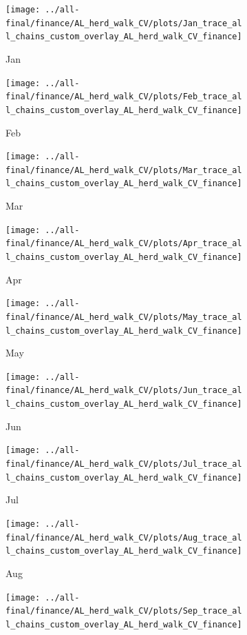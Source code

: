 \documentclass[ngerman]{ttlab-qualify}
\begin{document}
\newpage
\begin{figure}[H]
\centering
  \begin{subfigure}{.3\linewidth}
  \texttt{[image: ../all-final/finance/AL\_herd\_walk\_CV/plots/Jan\_trace\_all\_chains\_custom\_overlay\_AL\_herd\_walk\_CV\_finance]}\hfill
  \caption{Jan}
  \end{subfigure}
  \begin{subfigure}{.3\linewidth}
  \texttt{[image: ../all-final/finance/AL\_herd\_walk\_CV/plots/Feb\_trace\_all\_chains\_custom\_overlay\_AL\_herd\_walk\_CV\_finance]}\hfill
  \caption{Feb}
  \end{subfigure}
  \begin{subfigure}{.3\linewidth}
  \texttt{[image: ../all-final/finance/AL\_herd\_walk\_CV/plots/Mar\_trace\_all\_chains\_custom\_overlay\_AL\_herd\_walk\_CV\_finance]}\hfill
  \caption{Mar}
  \end{subfigure}\par\medskip
  \begin{subfigure}{.3\linewidth}
  \texttt{[image: ../all-final/finance/AL\_herd\_walk\_CV/plots/Apr\_trace\_all\_chains\_custom\_overlay\_AL\_herd\_walk\_CV\_finance]}\hfill
  \caption{Apr}
  \end{subfigure}
  \begin{subfigure}{.3\linewidth}
  \texttt{[image: ../all-final/finance/AL\_herd\_walk\_CV/plots/May\_trace\_all\_chains\_custom\_overlay\_AL\_herd\_walk\_CV\_finance]}\hfill
  \caption{May}
  \end{subfigure}
  \begin{subfigure}{.3\linewidth}
  \texttt{[image: ../all-final/finance/AL\_herd\_walk\_CV/plots/Jun\_trace\_all\_chains\_custom\_overlay\_AL\_herd\_walk\_CV\_finance]}\hfill
  \caption{Jun}
  \end{subfigure}\par\medskip
  \begin{subfigure}{.3\linewidth}
  \texttt{[image: ../all-final/finance/AL\_herd\_walk\_CV/plots/Jul\_trace\_all\_chains\_custom\_overlay\_AL\_herd\_walk\_CV\_finance]}\hfill
  \caption{Jul}
  \end{subfigure}
  \begin{subfigure}{.3\linewidth}
  \texttt{[image: ../all-final/finance/AL\_herd\_walk\_CV/plots/Aug\_trace\_all\_chains\_custom\_overlay\_AL\_herd\_walk\_CV\_finance]}\hfill
  \caption{Aug}
  \end{subfigure}
  \begin{subfigure}{.3\linewidth}
  \texttt{[image: ../all-final/finance/AL\_herd\_walk\_CV/plots/Sep\_trace\_all\_chains\_custom\_overlay\_AL\_herd\_walk\_CV\_finance]}\hfill

\end{subfigure}
\end{figure}
\end{document}
